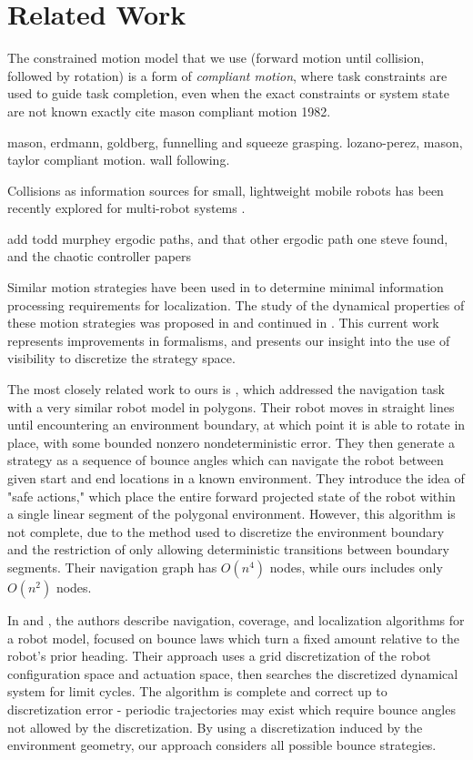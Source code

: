 \documentclass[]{svproc}  %
\begin{document}
\section{Related Work}

The constrained motion model that we use (forward motion until collision,
followed by rotation) is a
form of \emph{compliant motion}, where task constraints are used to guide task
completion, even when the exact constraints or system state are not known
exactly {\color{red} cite mason compliant motion 1982}.

{\color{red} mason, erdmann, goldberg, funnelling and squeeze grasping.
lozano-perez, mason, taylor compliant motion. wall following.}

Collisions as information sources for small, lightweight mobile robots has been
recently explored for multi-robot systems \cite{mayya2017collisions}.

{\color{red} add todd murphey ergodic paths, and that other ergodic path one steve
found, and the chaotic controller papers}

Similar motion strategies have been used in \cite{OkaLav06} to determine minimal
information processing requirements for localization. The study of the dynamical
properties of these motion strategies was proposed in \cite{bounce} and
continued in \cite{NilBecLav17}. This current work represents improvements in
formalisms, and presents our insight into the use of visibility to discretize the
strategy space.

The most closely related work to ours is \cite{LewOKa13}, which addressed the
navigation task with a very similar robot model in polygons. Their robot moves
in straight lines until encountering an environment boundary, at which point it
is able to rotate in place, with some bounded nonzero nondeterministic error.
They then generate a strategy as a sequence of bounce angles which can navigate
the robot between given start and end locations in a known environment. They
introduce the idea of "safe actions," which place the entire forward projected
state of the robot within a single linear segment of the polygonal environment.
However, this algorithm is not complete, due to the method used to discretize
the environment boundary and the restriction of only allowing deterministic
transitions between boundary segments. Their navigation graph has $O(n^4)$
nodes, while ours includes only $O(n^2)$ nodes.

In \cite{alam2017minimalist} and \cite{alam2018space}, the authors describe
navigation, coverage, and localization algorithms for a robot model, focused
on bounce laws which turn a fixed amount relative to the robot's prior heading. 
Their approach uses a grid discretization of the robot configuration space and actuation
space, then searches the discretized dynamical system for limit cycles. The
algorithm is complete and correct up to discretization error - periodic
trajectories may exist which require bounce angles not allowed by the
discretization. By using a discretization induced by the environment geometry,
our approach considers all possible bounce strategies.
\end{document}
